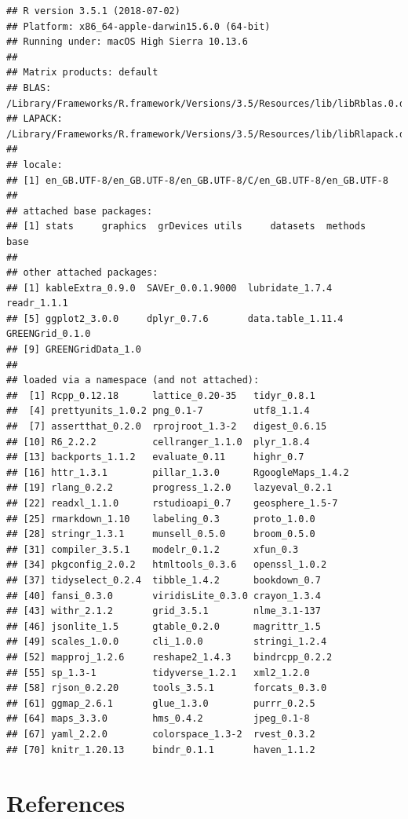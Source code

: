 \documentclass[]{article}
\theoremstyle{definition}
\theoremstyle{definition}
\theoremstyle{definition}
\theoremstyle{remark}
\begin{document}
\begin{verbatim}
## R version 3.5.1 (2018-07-02)
## Platform: x86_64-apple-darwin15.6.0 (64-bit)
## Running under: macOS High Sierra 10.13.6
## 
## Matrix products: default
## BLAS: /Library/Frameworks/R.framework/Versions/3.5/Resources/lib/libRblas.0.dylib
## LAPACK: /Library/Frameworks/R.framework/Versions/3.5/Resources/lib/libRlapack.dylib
## 
## locale:
## [1] en_GB.UTF-8/en_GB.UTF-8/en_GB.UTF-8/C/en_GB.UTF-8/en_GB.UTF-8
## 
## attached base packages:
## [1] stats     graphics  grDevices utils     datasets  methods   base     
## 
## other attached packages:
## [1] kableExtra_0.9.0  SAVEr_0.0.1.9000  lubridate_1.7.4   readr_1.1.1      
## [5] ggplot2_3.0.0     dplyr_0.7.6       data.table_1.11.4 GREENGrid_0.1.0  
## [9] GREENGridData_1.0
## 
## loaded via a namespace (and not attached):
##  [1] Rcpp_0.12.18      lattice_0.20-35   tidyr_0.8.1      
##  [4] prettyunits_1.0.2 png_0.1-7         utf8_1.1.4       
##  [7] assertthat_0.2.0  rprojroot_1.3-2   digest_0.6.15    
## [10] R6_2.2.2          cellranger_1.1.0  plyr_1.8.4       
## [13] backports_1.1.2   evaluate_0.11     highr_0.7        
## [16] httr_1.3.1        pillar_1.3.0      RgoogleMaps_1.4.2
## [19] rlang_0.2.2       progress_1.2.0    lazyeval_0.2.1   
## [22] readxl_1.1.0      rstudioapi_0.7    geosphere_1.5-7  
## [25] rmarkdown_1.10    labeling_0.3      proto_1.0.0      
## [28] stringr_1.3.1     munsell_0.5.0     broom_0.5.0      
## [31] compiler_3.5.1    modelr_0.1.2      xfun_0.3         
## [34] pkgconfig_2.0.2   htmltools_0.3.6   openssl_1.0.2    
## [37] tidyselect_0.2.4  tibble_1.4.2      bookdown_0.7     
## [40] fansi_0.3.0       viridisLite_0.3.0 crayon_1.3.4     
## [43] withr_2.1.2       grid_3.5.1        nlme_3.1-137     
## [46] jsonlite_1.5      gtable_0.2.0      magrittr_1.5     
## [49] scales_1.0.0      cli_1.0.0         stringi_1.2.4    
## [52] mapproj_1.2.6     reshape2_1.4.3    bindrcpp_0.2.2   
## [55] sp_1.3-1          tidyverse_1.2.1   xml2_1.2.0       
## [58] rjson_0.2.20      tools_3.5.1       forcats_0.3.0    
## [61] ggmap_2.6.1       glue_1.3.0        purrr_0.2.5      
## [64] maps_3.3.0        hms_0.4.2         jpeg_0.1-8       
## [67] yaml_2.2.0        colorspace_1.3-2  rvest_0.3.2      
## [70] knitr_1.20.13     bindr_0.1.1       haven_1.1.2
\end{verbatim}

\section*{References}\label{references}
\end{document}
